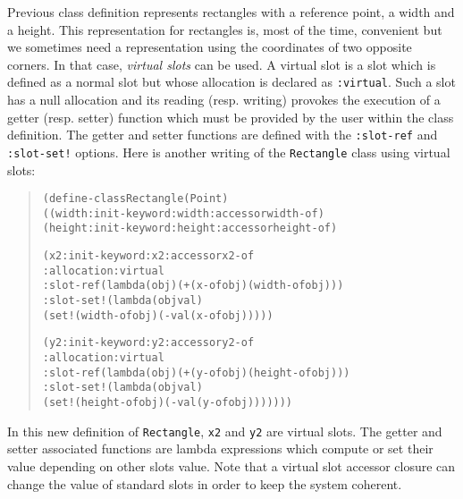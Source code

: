{Previous class definition represents rectangles with a reference point, a
width and a height. This representation for rectangles is, most of the
time, convenient but we sometimes need a representation using the
coordinates of two opposite corners. In that case, {\em virtual slots} can
be used\label{virtual-slot}. A virtual slot is a slot which is defined as a
normal slot but whose allocation is declared as {\tt :virtual}. Such a slot
has a null allocation and its reading (resp. writing) provokes the
execution of a getter (resp. setter) function which must be provided by the
user within the class definition. The getter and setter functions are
defined with the {\tt :slot-ref} and {\tt :slot-set!} options. Here is
another writing of the {\tt Rectangle} class using virtual slots:

\begin{quote}\figsize
\begin{alltt}
(define-class Rectangle (Point)
  ((width  :init-keyword :width  :accessor width-of)
   (height :init-keyword :height :accessor height-of)
\end{alltt}
\begin{alltt}
   (x2     :init-keyword :x2     :accessor x2-of 
           :allocation   :virtual
           :slot-ref  (lambda (obj) (+ (x-of obj) (width-of obj)))
           :slot-set! (lambda (obj val) 
                        (set! (width-of obj) (- val (x-of obj)))))
\end{alltt}
\begin{alltt}
   (y2     :init-keyword :y2 :accessor y2-of 
           :allocation   :virtual
           :slot-ref  (lambda (obj) (+ (y-of obj) (height-of obj)))
           :slot-set! (lambda (obj val) 
                        (set! (height-of obj) (- val (y-of obj)))))))
\end{alltt}
\end{quote}
In this new definition of {\tt Rectangle}, {\tt x2} and {\tt y2} are
virtual slots. The getter and setter associated functions are
lambda expressions which  compute or set their value depending on
other slots value. Note that a  virtual slot accessor closure can
change the value of standard slots in order to keep the system
coherent.

}
